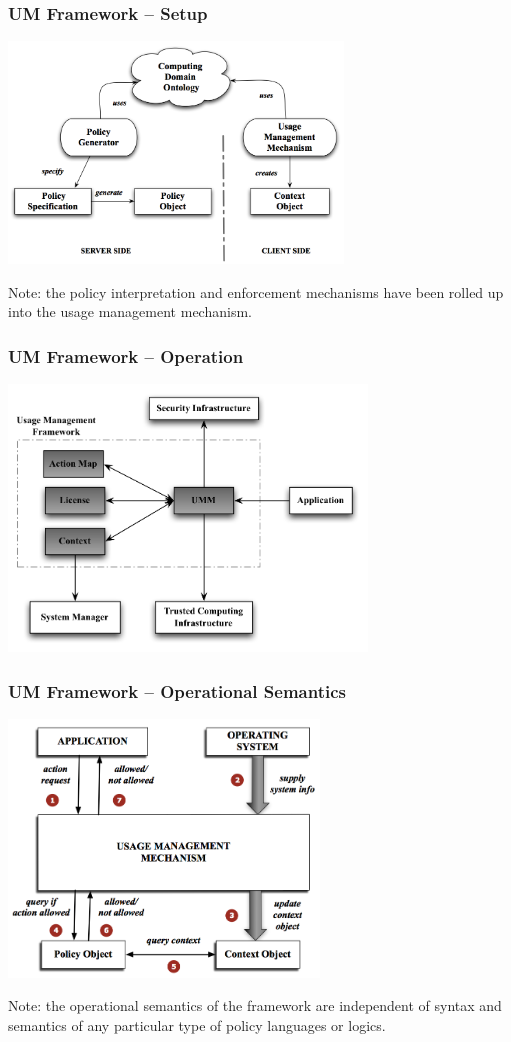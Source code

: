 \documentclass[t,handout, 10pt]{beamer}
\begin{document}
\begin{frame}\frametitle{UM Framework -- Setup}
  \centerline{\includegraphics[width=3.5in]{UM-setup.png}}
    {\small Note: the policy interpretation and enforcement mechanisms have been rolled up into the usage management mechanism.}
\end{frame}  

  
\begin{frame}\frametitle{UM Framework -- Operation}
  \centerline{\includegraphics[width=3.75in]{UM-operation.png}}
\end{frame}  

\begin{frame}\frametitle{UM Framework -- Operational Semantics}
\vspace*{-0.1in}
  \centerline{\includegraphics[width=3.25in]{UM-working.png}}
  {\small Note:  the operational semantics of the framework are independent of syntax and semantics of any particular type of policy languages or logics.}
\end{frame}  
  
\end{document}
